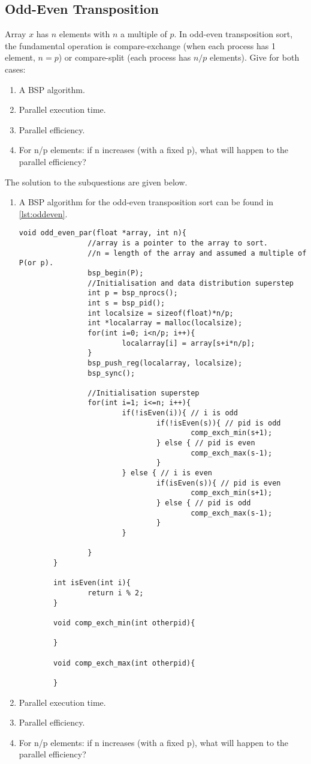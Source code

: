 \documentclass[../main.tex]{subfiles}
\begin{document}
\subsection{Odd-Even Transposition}
\begin{question}
Array $x$ has $n$ elements with $n$ a multiple of $p$. In odd-even transposition sort, the fundamental operation is compare-exchange (when each process has 1 element, $n = p$) or compare-split (each process has $n/p$ elements). Give for both cases:
\begin{enumerate}
	\item A BSP algorithm.
	\item Parallel execution time.
	\item Parallel efficiency.
	\item For n/p elements: if n increases (with a fixed p), what will happen to the parallel efficiency?
\end{enumerate}

\end{question}
\begin{solution} The solution to the subquestions are given below.
\begin{enumerate}
	\item A BSP algorithm for the odd-even transposition sort can be found in \autoref{lst:oddeven}.
		\begin{lstlisting}[caption="BSP odd-even transposition sort.",label=lst:oddeven]
		void odd_even_par(float *array, int n){
				//array is a pointer to the array to sort.
				//n = length of the array and assumed a multiple of P(or p).
				bsp_begin(P);
				//Initialisation and data distribution superstep
				int p = bsp_nprocs(); 
				int s = bsp_pid();
				int localsize = sizeof(float)*n/p;
				int *localarray = malloc(localsize);
				for(int i=0; i<n/p; i++){
						localarray[i] = array[s+i*n/p];
				}
				bsp_push_reg(localarray, localsize);
				bsp_sync();
				
				//Initialisation superstep
				for(int i=1; i<=n; i++){
						if(!isEven(i)){ // i is odd
								if(!isEven(s)){ // pid is odd
										comp_exch_min(s+1);
								} else { // pid is even
										comp_exch_max(s-1);
								}
						} else { // i is even
								if(isEven(s)){ // pid is even
										comp_exch_min(s+1);
								} else { // pid is odd 
										comp_exch_max(s-1);
								}
						}

				}
		}

		int isEven(int i){
				return i % 2;	
		}

		void comp_exch_min(int otherpid){
				
		}

		void comp_exch_max(int otherpid){
		
		}
		\end{lstlisting}
			
	\item Parallel execution time.
	\item Parallel efficiency.
	\item For n/p elements: if n increases (with a fixed p), what will happen to the parallel efficiency?
\end{enumerate}
\end{solution}
\end{document}
